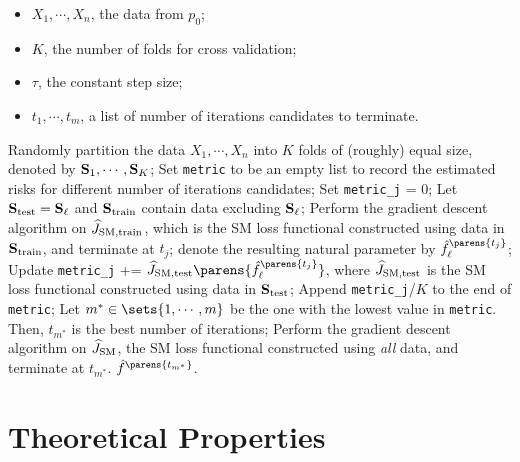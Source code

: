 \begin{algorithm}
\caption{$K$-fold cross-validation method to determine when to terminate}\label{algo-early-stopping-cv}
\begin{algorithmic}[1]
\Statex \algorithmicrequire 
\begin{itemize}\setlength\itemsep{0em}
	\item $X_1, \cdots, X_n$, the data from $p_0$; 
	\item $K$, the number of folds for cross validation; 
	\item $\tau$, the constant step size; 
	\item $t_1, \cdots, t_m$, a list of number of iterations candidates to terminate. 
\end{itemize}

\State Randomly partition the data $X_1, \cdots, X_n$ into $K$ folds of (roughly) equal size, denoted by $\mathbf{S}_{1}, \cdots, \mathbf{S}_{K}$; 
\State Set \texttt{metric} to be an empty list to record the estimated risks for different number of iterations candidates; 
\State Set \texttt{metric\_j} = 0; 
\State Let $\mathbf{S}_{\mathrm{test}} = \mathbf{S}_{\ell}$ and $\mathbf{S}_{\mathrm{train}}$ contain data excluding $\mathbf{S}_{\ell}$; 
\State Perform the gradient descent algorithm on $\widehat{J}_{\mathrm{SM}, \mathrm{train}}$, which is the SM loss functional constructed using data in $\mathbf{S}_{\mathrm{train}}$, and terminate at $t_j$; denote the resulting natural parameter by $\hat{f}_{\ell}^{\parens{t_j}}$; 
\State Update \texttt{metric\_j} += $\widehat{J}_{\SM, \mathrm{test}} \parens{\hat{f}_{\ell}^{\parens{t_j}}}$, where $\widehat{J}_{\mathrm{SM}, \mathrm{test}}$ is the SM loss functional constructed using data in $\mathbf{S}_{\mathrm{test}}$; 
\EndFor
\State Append \texttt{metric\_j}/$K$ to the end of \texttt{metric}; 
\EndFor
\State Let $m^* \in \sets{1, \cdots, m}$ be the one with the lowest value in \texttt{metric}. Then, $t_{m^*}$ is the best number of iterations; 
\State Perform the gradient descent algorithm on $\widehat{J}_{\mathrm{SM}}$, the SM loss functional constructed using \emph{all} data, and terminate at $t_{m^*}$. 
\State \Return $\hat{f}^{\parens{t_{m^*}}}$. 
\end{algorithmic}
\end{algorithm}


\section{Theoretical Properties}\label{section-theoretical-properties}

